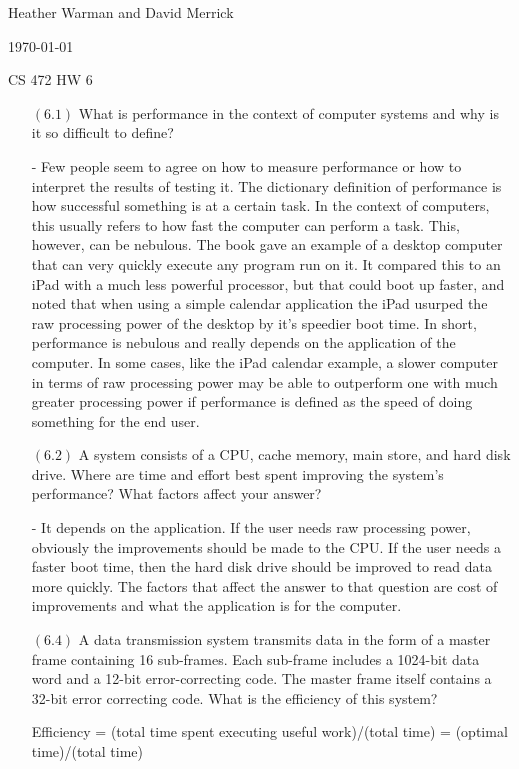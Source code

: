 \documentclass[letterpaper,10pt,titlepage]{article}
\def\name{Heather Warman and David Merrick}
\begin{document}
\hfill \name

\hfill \today

\hfill CS 472 HW 6

\begin{enumerate}
\item[$(6.1)$] What is performance in the context of computer systems and why is it so difficult to define?

- Few people seem to agree on how to measure performance or how to interpret the results of testing it. The dictionary definition of performance is how successful something is at a certain task. In the context of computers, this usually refers to how fast the computer can perform a task. This, however, can be nebulous. The book gave an example of a desktop computer that can very quickly execute any program run on it. It compared this to an iPad with a much less powerful processor, but that could boot up faster, and noted that when using a simple calendar application the iPad usurped the raw processing power of the desktop by it’s speedier boot time. In short, performance is nebulous and really depends on the application of the computer. In some cases, like the iPad calendar example, a slower computer in terms of raw processing power may be able to outperform one with much greater processing power if performance is defined as the speed of doing something for the end user.


\item[$(6.2)$] A system consists of a CPU, cache memory, main store, and hard disk drive. Where are time and effort best spent improving the system’s performance? What factors affect your answer?

- It depends on the application. If the user needs raw processing power, obviously the improvements should be made to the CPU. If the user needs a faster boot time, then the hard disk drive should be improved to read data more quickly. The factors that affect the answer to that question are cost of improvements and what the application is for the computer. 


\item[$(6.4)$] A data transmission system transmits data in the form of a master frame containing 16 sub-frames. Each sub-frame includes a 1024-bit data word and a 12-bit error-correcting code. The master frame itself contains a 32-bit error correcting code. What is the efficiency of this system?

Efficiency = (total time spent executing useful work)/(total time) = (optimal time)/(total time)


\end{enumerate}
\end{document}
